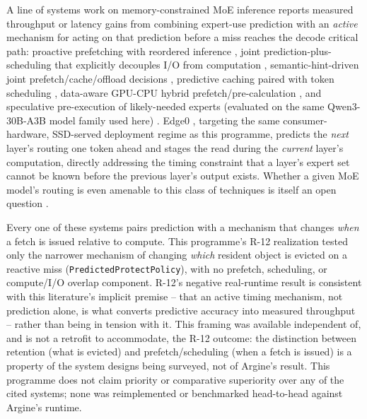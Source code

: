 A line of systems work on memory-constrained MoE inference reports measured
throughput or latency gains from combining expert-use prediction with an
\emph{active} mechanism for acting on that prediction before a miss reaches
the decode critical path: proactive prefetching with reordered inference
\cite{promoe2025}, joint prediction-plus-scheduling that explicitly
decouples I/O from computation \cite{prescope2025}, semantic-hint-driven
joint prefetch/cache/offload decisions \cite{finemoe2026}, predictive
caching paired with token scheduling \cite{expertflow2026}, data-aware
GPU-CPU hybrid prefetch/pre-calculation \cite{daop2025}, and speculative
pre-execution of likely-needed experts \cite{speculatingexperts2026}
(evaluated on the same Qwen3-30B-A3B model family used here)
\cite{moespeq2026}. Edge0 \cite{edge02026}, targeting the same
consumer-hardware, SSD-served deployment regime as this programme, predicts
the \emph{next} layer's routing one token ahead and stages the read during
the \emph{current} layer's computation, directly addressing the timing
constraint that a layer's expert set cannot be known before the previous
layer's output exists. Whether a given MoE model's routing is even
amenable to this class of techniques is itself an open question
\cite{localroutingconsistency2025}.

Every one of these systems pairs prediction with a mechanism that changes
\emph{when} a fetch is issued relative to compute. This programme's R-12
realization tested only the narrower mechanism of changing \emph{which}
resident object is evicted on a reactive miss (\texttt{PredictedProtectPolicy}),
with no prefetch, scheduling, or compute/I/O overlap component. R-12's
negative real-runtime result is consistent with this literature's implicit
premise -- that an active timing mechanism, not prediction alone, is what
converts predictive accuracy into measured throughput -- rather than being in
tension with it. This framing was available independent of, and is not a
retrofit to accommodate, the R-12 outcome: the distinction between
retention (what is evicted) and prefetch/scheduling (when a fetch is issued)
is a property of the system designs being surveyed, not of Argine's result.
This programme does not claim priority or comparative superiority over any
of the cited systems; none was reimplemented or benchmarked head-to-head
against Argine's runtime.

